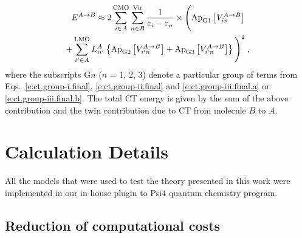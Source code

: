 %
\begin{multline} \label{e:ect-oep.final}
 E^{A\rightarrow B} \approx
 2 
 \sum_{i\in A}^{\rm CMO}
 \sum_{n\in B}^{\rm Vir}
 \frac{1}{\varepsilon_i - \varepsilon_n} \times 
 \Bigg(
   \Approx{V_{in}^{A\rightarrow B}}{\rm G1} \\
  +
   \sum_{i'\in A}^{\rm LMO} L_{ii'}^A
   \left\{
   \Approx{V_{i'n}^{A\rightarrow B}}{\rm G2} 
  +\Approx{V_{i'n}^{A\rightarrow B}}{\rm G3}
  \right\}
 \Bigg)^2 \;,
\end{multline}
%
where the subscripts G$n$ ($n$ = 1, 2, 3) denote a particular group of 
terms from Eqs.~\eqref{e:ct.group-i.final}, \eqref{e:ct.group-ii.final} and \eqref{e:ct.group-iii.final.a}
or \eqref{e:ct.group-iii.final.b}. 
The total CT energy is given by the sum of the above contribution and the twin contribution
due to CT from molecule $B$ to $A$.

%
%




\section{\label{s:4}Calculation Details}

All the models that were used to test the theory presented in this work
were implemented in our in\hyp{}house plugin to {\sc Psi4} quantum chemistry program.\cite{Psi4.JCTC.2017}


\subsection{\label{s:413s6}Reduction of computational costs}

